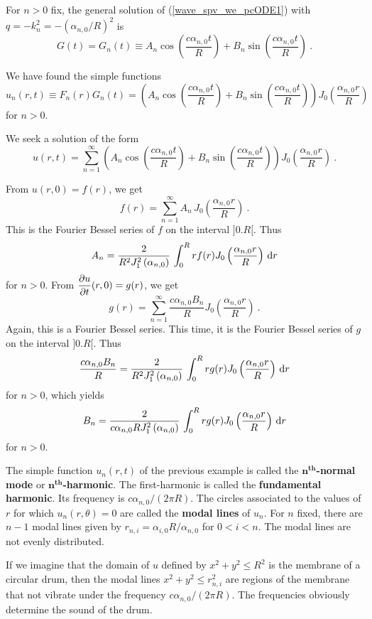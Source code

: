 \begin{egg}
For $n>0$ fix, the general solution of (\ref{wave_spv_we_pcODE1})
with $\displaystyle q=-k_n^2 = -(\alpha_{n,0}/R)^2$ is
\[
G(t) = G_n(t) \equiv A_n \cos\left(\frac{c \alpha_{n,0} t}{R}\right)
+ B_n \sin\left(\frac{c \alpha_{n,0} t}{R}\right) \ .
\]

We have found the simple functions
\[
u_n(r,t) \equiv
F_n(r)G_n(t) = \left(A_n \cos\left(\frac{c \alpha_{n,0} t}{R}\right)
+ B_n \sin\left(\frac{c \alpha_{n,0} t}{R}\right)\right)
J_0\left(\frac{\alpha_{n,0}r}{R}\right)
\]
for $n > 0$.

We seek a solution of the form
\[
u(r,t) = \sum_{n=1}^\infty \left(A_n \cos\left(\frac{c \alpha_{n,0} t}{R}\right)
+ B_n \sin\left(\frac{c \alpha_{n,0} t}{R}\right)\right)
J_0\left(\frac{\alpha_{n,0}r}{R}\right) \ .
\]

From $u(r,0) = f(r)$, we get
\[
f(r) = \sum_{n=1}^\infty A_n \, J_0\left(\frac{\alpha_{n,0}r}{R}\right) \ .
\]
This is the Fourier Bessel series of $f$ on the interval $]0.R[$.
Thus
\[
A_n = \frac{2}{R^2 J_1^2\left(\alpha_{n,0}\right)} \,
\int_0^R r f(r) J_0\left(\frac{\alpha_{n,0} r}{R}\right) \,\mathrm{d}{r}
\]
for $n>0$.  From $\displaystyle \frac{\partial{u}}{\partial t}(r,0) = g(r)$, we get
\[
g(r) = \sum_{n=1}^\infty \frac{c \alpha_{n,0} B_n}{R}
J_0\left(\frac{\alpha_{n,0}r}{R}\right) \  .
\]
Again, this is a Fourier Bessel series.  This time, it is the Fourier
Bessel series of $g$ on the interval $]0.R[$.  Thus
\[
\frac{c \alpha_{n,0} B_n}{R} = \frac{2}{R^2 J_1^2\left(\alpha_{n,0}\right)} \,
\int_0^R r g(r) J_0\left(\frac{\alpha_{n,0} r}{R}\right) \,\mathrm{d}{r}
\]
for $n > 0$, which yields
\[
B_n = \frac{2}{c \alpha_{n,0} R J_1^2\left(\alpha_{n,0}\right)} \,
\int_0^R r g(r) J_0\left(\frac{\alpha_{n,0} r}{R}\right) \,\mathrm{d}{r}
\]
for $n > 0$.
\end{egg}

\begin{rmk}
The simple function $u_n(r,t)$ of the previous example is called the
{\bfseries $\mathbf{n^{th}}$-normal mode} or {\bfseries $\mathbf{n^{th}}$-harmonic}.  
The first-harmonic is called the
{\bfseries fundamental harmonic}.
Its frequency is $\displaystyle c\alpha_{n,0}/(2\pi R)$.
The circles associated to the values of $r$ for which
$u_n(r,\theta)=0$ are called the
{\bfseries modal lines} of $u_n$.
For $n$ fixed, there are $n-1$ modal lines given by
$\displaystyle r_{n,i} = \alpha_{i,0}R/\alpha_{n,0}$
for $0<i<n$.  The modal lines are not evenly distributed.

If we imagine that the domain of $u$ defined by
$x^2 + y^2 \leq R^2$ is the membrane of a circular drum, then the modal
lines $x^2 + y^2 \leq r_{n,i}^2$ are regions of the membrane that not
vibrate under the frequency $\displaystyle c\alpha_{n,0}/(2 \pi R)$.
The frequencies obviously determine the sound of the drum.
\end{rmk}

